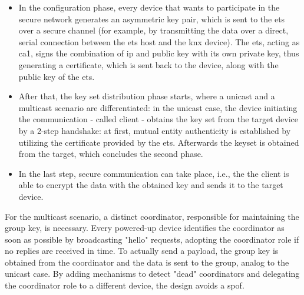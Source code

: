 \begin{itemize}
 \item In the configuration phase, every device that wants to participate in the secure network
generates an asymmetric key pair, which is sent to the \gls{ets} over a secure channel (for example, by transmitting the data over a direct, serial connection
between the \gls{ets} host and the \gls{knx} device).
The \gls{ets}, acting as \gls{ca1}, signs the combination of \gls{ip} and public key with its own private key, thus generating a certificate, which is sent back to the device, along
with the public key of the \gls{ets}. 
 \item After that, the key set distribution phase starts, where a unicast and a multicast scenario are differentiated:
in the unicast case, the device initiating the communication - called client - obtains the key set from the target device by a 2-step handshake: at first, mutual entity 
authenticity is established by utilizing the certificate provided by the \gls{ets}. Afterwards the keyset is obtained from the target, which concludes the second
phase.
\item In the last step, secure communication can take place, i.e., the the client is able to
encrypt the data with the obtained key and sends it to the target device.
\end{itemize}
For the multicast scenario, a distinct coordinator, responsible for maintaining the group key, is necessary. Every powered-up device
identifies the coordinator as soon as possible by broadcasting "hello" requests, adopting the coordinator role if no replies are received in time.
To actually send a payload, the group key is obtained from the coordinator and the data is sent to the group, analog to the unicast case.
By adding mechanisms to detect "dead" coordinators and delegating the coordinator role to a different device, the design avoids a \gls{spof}.

